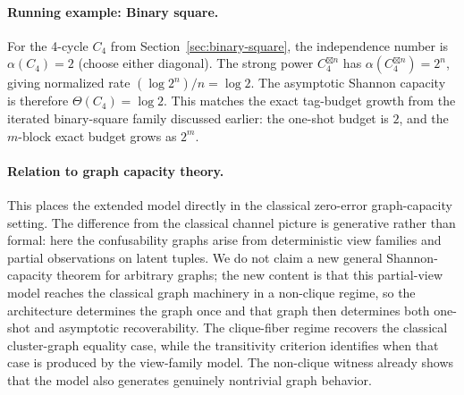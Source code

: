 \paragraph{Running example: Binary square.}
For the 4-cycle $C_4$ from Section~\ref{sec:binary-square}, the independence number is $\alpha(C_4) = 2$ (choose either diagonal). The strong power $C_4^{\boxtimes n}$ has $\alpha(C_4^{\boxtimes n}) = 2^n$, giving normalized rate $(\log 2^n)/n = \log 2$. The asymptotic Shannon capacity is therefore $\Theta(C_4) = \log 2$. This matches the exact tag-budget growth from the iterated binary-square family discussed earlier: the one-shot budget is $2$, and the $m$-block exact budget grows as $2^m$.

\paragraph{Relation to graph capacity theory.}
This places the extended model directly in the classical zero-error graph-capacity setting. The difference from the classical channel picture is generative rather than formal: here the confusability graphs arise from deterministic view families and partial observations on latent tuples. We do not claim a new general Shannon-capacity theorem for arbitrary graphs; the new content is that this partial-view model reaches the classical graph machinery in a non-clique regime, so the architecture determines the graph once and that graph then determines both one-shot and asymptotic recoverability. The clique-fiber regime recovers the classical cluster-graph equality case, while the transitivity criterion identifies when that case is produced by the view-family model. The non-clique witness already shows that the model also generates genuinely nontrivial graph behavior.
